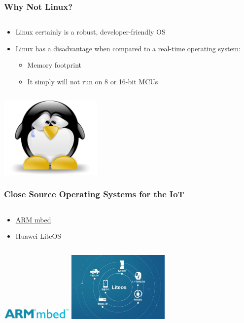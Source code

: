 \documentclass{beamer}
\begin{document}
\begin{frame}
	\frametitle{Why Not Linux?}
	\begin{columns}[c]
		\begin{column}{30cm}
			\vspace{.1cm}
			\begin{itemize}
				\justifying
				\item Linux certainly is a robust, developer-friendly OS
				\item Linux has a disadvantage when compared to a real-time operating system:
				\begin{itemize}
					\justifying
					\item Memory footprint
					\item It simply will not run on 8 or 16-bit MCUs
				\end{itemize}
			\end{itemize}
		\end{column}
	\end{columns}
	\vspace{.5cm}
	\hspace*{5.5cm} \includegraphics[width=5cm]{figs/tux-sad.png}
\end{frame}

\begin{frame}
	\frametitle{Close Source Operating Systems for the IoT}
	\begin{columns}[c]
		\begin{column}{30cm}
			\vspace{.1cm}
			\begin{itemize}
				\justifying
				\item \textcolor{blue}{\href{https://mbed.org/}{ARM mbed}}
				\item Huawei LiteOS
			\end{itemize}
		\end{column}
	\end{columns}
	\vspace{1cm}
	\hspace*{.5cm}
	\includegraphics[width=3.5cm]{figs/ARM-mbed-logo.png}
	\hspace*{2cm}
	\includegraphics[width=5cm]{figs/huawei-liteos-logo.jpg}
\end{frame}
\end{document}
